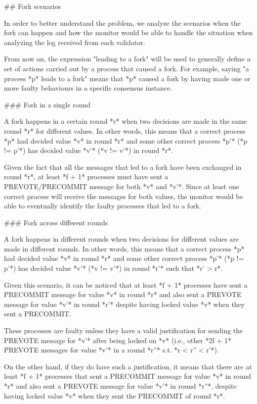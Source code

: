 \documentclass[a4paper,11pt,oneside]{report}
\begin{document}
\begin{markdown}
## Fork scenarios

In order to better understand the problem, we analyze the scenarios when the fork can happen and how the monitor would be able to handle the situation when analyzing the log received from each validator.

From now on, the expression "leading to a fork" will be used to generally define a set of actions carried out by a process that caused a fork. 
For example, saying "a process *p* leads to a fork" means that *p* caused a fork by having made one or more faulty behaviours in a specific consensus instance.

### Fork in a single round

A fork happens in a certain round *r* when two decisions are made in the same round *r* for different values.
In other words, this means that a correct process *p* had decided value *v* in round *r* and some other correct process *p'* (*p != p'*) has decided value *v'* (*v != v'*) in round *r*. 

Given the fact that all the messages that led to a fork have been exchanged in round *r*, at least *f + 1* processes must have sent a PREVOTE/PRECOMMIT message for both *v* and *v'*.
Since at least one correct process will receive the messages for both values, the monitor would be able to eventually identify the faulty processes that led to a fork.  

### Fork across different rounds

A fork happens in different rounds when two decisions for different values are made in different rounds. 
In other words, this means that a correct process *p* had decided value *v* in round *r* and some other correct process *p'* (*p != p'*) has decided value *v'* (*v != v'*) in round *r'* such that *r' > r*. 

Given this scenario, it can be noticed that at least *f + 1* processes have sent a PRECOMMIT message for value *v* in round *r* and also sent a PREVOTE message for value *v'* in round *r'* despite having locked value *v* when they sent a PRECOMMIT.

These processes are faulty unless they have a valid justification for sending the PREVOTE message for *v'* after being locked on *v* (i.e., other *2f + 1* PREVOTE messages for value *v'* in a round *r''* s.t. *r < r'' < r'*).
 
On the other hand, if they do have such a justification, it means that there are at least *f + 1* processes that sent a PRECOMMIT message for value *v* in round *r* and also sent a PREVOTE message for value *v'* in round *r''*, despite having locked value *v* when they sent the PRECOMMIT of round *r*.


\end{markdown}
\end{document}
